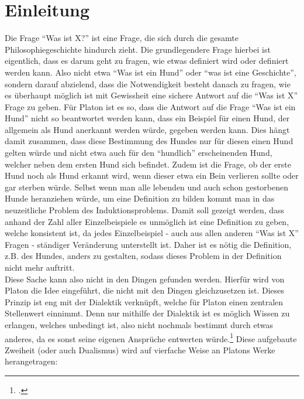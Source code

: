 \section{Einleitung}

Die Frage \enquote{Was ist X?} ist eine Frage, die sich durch die gesamte Philosophiegeschichte hindurch zieht. Die grundlegendere Frage hierbei ist eigentlich, dass es darum geht zu fragen, wie etwas definiert wird oder definiert werden kann. Also nicht etwa \enquote{Was ist ein Hund} oder \enquote{was ist eine Geschichte}, sondern darauf abzielend, dass die Notwendigkeit besteht danach zu fragen, wie es überhaupt möglich ist mit Gewissheit eine sichere Antwort auf die \enquote{Was ist X} Frage zu geben. Für Platon ist es so, dass die Antwort auf die Frage \enquote{Was ist ein Hund} nicht so beantwortet werden kann, dass ein Beispiel für einen Hund, der allgemein als Hund anerkannt werden würde, gegeben werden kann. Dies hängt damit zusammen, dass diese Bestimmung des Hundes nur für diesen einen Hund gelten würde und nicht etwa auch für den \enquote{hundlich} erscheinenden Hund, welcher neben dem ersten Hund sich befindet. Zudem ist die Frage, ob der erste Hund noch als Hund erkannt wird, wenn dieser etwa ein Bein verlieren sollte oder gar sterben würde. Selbst wenn man alle lebenden und auch schon gestorbenen Hunde heranziehen würde, um eine Definition zu bilden kommt man in das neuzeitliche Problem des Induktionsproblems. Damit soll gezeigt werden, dass anhand der Zahl aller Einzelbeispiele es unmöglich ist eine Definition zu geben, welche konsistent ist, da jedes Einzelbeispiel - auch aus allen anderen \enquote{Was ist X} Fragen - ständiger Veränderung unterstellt ist. Daher ist es nötig die Definition, z.B. des Hundes, anders zu gestalten, sodass dieses Problem in der Definition nicht mehr auftritt.\\
Diese Sache kann also nicht in den Dingen gefunden werden. Hierfür wird von Platon die Idee eingeführt, die nicht mit den Dingen gleichzusetzen ist. 
Dieses Prinzip ist eng mit der Dialektik verknüpft, welche für Platon einen zentralen Stellenwert einnimmt. Denn nur mithilfe der Dialektik ist es möglich Wissen zu erlangen, welches unbedingt ist, also nicht nochmals bestimmt durch etwas anderes, da es sonst seine eigenen Ansprüche entwerten würde.\footcite[vgl.][S.83]{Staudacher}
Diese aufgebaute Zweiheit (oder auch Dualismus) wird auf vierfache Weise an Platons Werke herangetragen:
